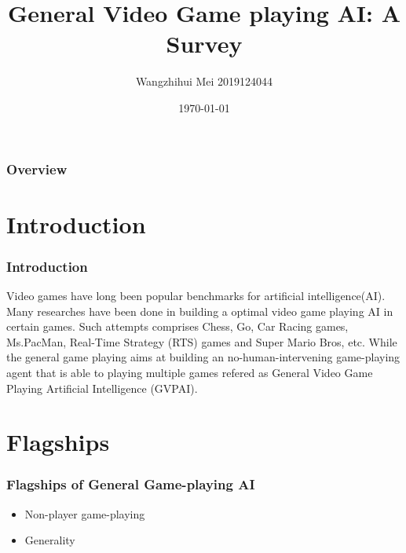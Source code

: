 \documentclass{beamer}
\title[Short title]{General Video Game playing AI: A Survey} %
\author{ Wangzhihui Mei 2019124044} %
\institute[JI] %
{
CCNU-UOW JI \\ %
\medskip
\textit{maywzh@gmail.com} %
}
\date{\today} %
\begin{document}
\begin{frame}
\titlepage %
\end{frame}

\begin{frame}
\frametitle{Overview} %
\tableofcontents %
\end{frame}


\section{Introduction}
\begin{frame}
\frametitle{Introduction}
Video games have long been popular benchmarks for artificial intelligence(AI). Many researches have been done in building a optimal video game playing AI in certain games. Such attempts comprises Chess, Go, Car Racing games, Ms.PacMan, Real-Time Strategy (RTS) games and Super Mario Bros, etc. While the general game playing aims at building an no-human-intervening game-playing agent that is able to playing multiple games refered as General Video Game Playing Artificial Intelligence (GVPAI).

\end{frame}

\section{Flagships}
\begin{frame}
\frametitle{Flagships of General Game-playing AI}
\begin{itemize}
\item Non-player game-playing
\item Generality
\end{itemize}
\end{frame}
\end{document}
